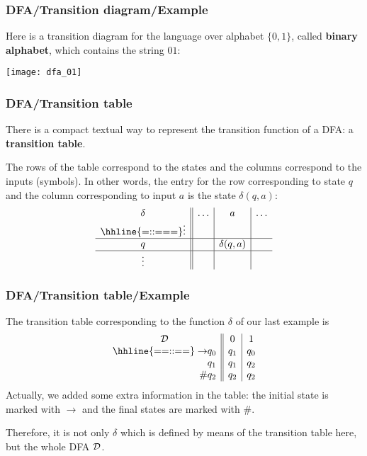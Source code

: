 % 
\begin{frame}
\frametitle{DFA/Transition diagram/Example}

Here is a transition diagram for the language over alphabet \(\{0,
1\}\), called \textbf{binary alphabet}, which contains the string
\(01\):
\begin{center}
\texttt{[image: dfa\_01]}
\end{center} 

\end{frame}

% 
\begin{frame}
\frametitle{DFA/Transition table}

There is a compact textual way to represent the transition function of
a DFA: a \textbf{transition table}.

\bigskip

The rows of the table correspond to the states and the columns
correspond to the inputs (symbols). In other words, the entry for
the row corresponding to state \(q\) and the column corresponding to
input \(a\) is the state \(\delta (q, a)\):
\[
\begin{array}{c||c|c|c}
\delta & \ldots & a & \ldots\\
\hhline{=::===}
\vdots & & &\\
\hline
q & & \delta (q, a)\\
\hline
\vdots & & &
\end{array}
\]

\end{frame}

% 
\begin{frame}
\frametitle{DFA/Transition table/Example}

The transition table corresponding to the function \(\delta\) of our
last example is
\[
\begin{array}{r@{}l||c|c}
\multicolumn{2}{c||}{\cal D} & 0 & 1\\
\hhline{==::==}
\rightarrow & q_0 & q_1 & q_0\\
            & q_1 & q_1 & q_2\\
         \# & q_2 & q_2 & q_2
\end{array}
\]
Actually, we added some extra information in the table: the initial
state is marked with \(\rightarrow\) and the final states are marked
with \(\#\).

\bigskip

Therefore, it is not only \(\delta\) which is defined by means of the
transition table here, but the whole DFA \(\cal D\).

\end{frame}


